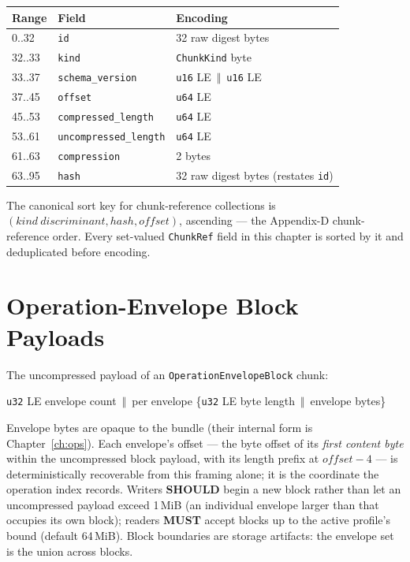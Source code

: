 \documentclass[11pt,letterpaper]{report}
\newcommand{\tablenums}[1]{{\addfontfeatures{Numbers={Lining,Tabular}}#1}}
\newcommand{\MUST}{\textbf{MUST}}
\newcommand{\SHOULD}{\textbf{SHOULD}}
\newcommand{\cat}{\ensuremath{\,\Vert\,}}
\begin{document}
\begingroup\small
\begin{longtable}{p{0.9in} p{1.9in} p{2.8in}}
  \toprule
  \textbf{Range} & \textbf{Field} & \textbf{Encoding} \\
  \midrule
  \endhead
  \tablenums{0..32} & \texttt{id} & 32 raw digest bytes \\
  \tablenums{32..33} & \texttt{kind} & \texttt{ChunkKind} byte \\
  \tablenums{33..37} & \texttt{schema\_version} & \texttt{u16} LE \cat{}
    \texttt{u16} LE \\
  \tablenums{37..45} & \texttt{offset} & \texttt{u64} LE \\
  \tablenums{45..53} & \texttt{compressed\_length} & \texttt{u64} LE \\
  \tablenums{53..61} & \texttt{uncompressed\_length} & \texttt{u64} LE \\
  \tablenums{61..63} & \texttt{compression} & 2 bytes \\
  \tablenums{63..95} & \texttt{hash} & 32 raw digest bytes (restates
    \texttt{id}) \\
  \bottomrule
\end{longtable}
\endgroup

The canonical sort key for chunk-reference collections is
$(\mathit{kind\ discriminant}, \mathit{hash}, \mathit{offset})$, ascending
--- the Appendix-D chunk-reference order. Every set-valued
\texttt{ChunkRef} field in this chapter is sorted by it and deduplicated
before encoding.

\section{Operation-Envelope Block Payloads}
\label{sec:bundle:blocks}

The uncompressed payload of an \texttt{OperationEnvelopeBlock} chunk:

\begin{center}
\texttt{u32} LE envelope count \cat{} per envelope
\{\texttt{u32} LE byte length \cat{} envelope bytes\}
\end{center}

Envelope bytes are opaque to the bundle (their internal form is
Chapter~\ref{ch:ops}). Each envelope's offset --- the byte offset of its
\emph{first content byte} within the uncompressed block payload, with its
length prefix at $\mathit{offset}-4$ --- is deterministically recoverable
from this framing alone; it is the coordinate the operation index records.
Writers \SHOULD{} begin a new block rather than let an uncompressed payload
exceed 1\,MiB (an individual envelope larger than that occupies its own
block); readers \MUST{} accept blocks up to the active profile's bound
(default 64\,MiB). Block boundaries are storage artifacts: the envelope set
is the union across blocks.
\end{document}
